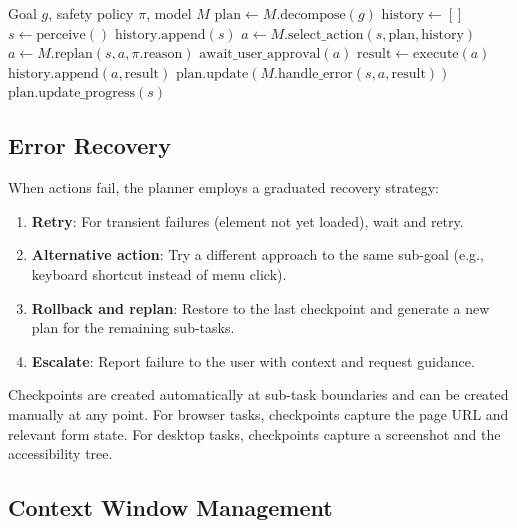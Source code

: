\begin{algorithm}[t]
\caption{Observation-Action Loop}
\label{alg:loop}
\begin{algorithmic}[1]
\REQUIRE Goal $g$, safety policy $\pi$, model $M$
\STATE $\text{plan} \gets M.\text{decompose}(g)$
\STATE $\text{history} \gets []$
    \STATE $s \gets \text{perceive}()$ 
    \STATE $\text{history.append}(s)$
    \STATE $a \gets M.\text{select\_action}(s, \text{plan}, \text{history})$
        \STATE $a \gets M.\text{replan}(s, a, \pi.\text{reason})$
    \ENDIF
        \STATE $\text{await\_user\_approval}(a)$
    \ENDIF
    \STATE $\text{result} \gets \text{execute}(a)$
    \STATE $\text{history.append}(a, \text{result})$
        \STATE $\text{plan.update}(M.\text{handle\_error}(s, a, \text{result}))$
    \ENDIF
    \STATE $\text{plan.update\_progress}(s)$
\ENDWHILE
\end{algorithmic}
\end{algorithm}

\subsection{Error Recovery}

When actions fail, the planner employs a graduated recovery strategy:

\begin{enumerate}[leftmargin=*]
    \item \textbf{Retry}: For transient failures (element not yet loaded), wait and retry.
    \item \textbf{Alternative action}: Try a different approach to the same sub-goal (e.g., keyboard shortcut instead of menu click).
    \item \textbf{Rollback and replan}: Restore to the last checkpoint and generate a new plan for the remaining sub-tasks.
    \item \textbf{Escalate}: Report failure to the user with context and request guidance.
\end{enumerate}

Checkpoints are created automatically at sub-task boundaries and can be created manually at any point. For browser tasks, checkpoints capture the page URL and relevant form state. For desktop tasks, checkpoints capture a screenshot and the accessibility tree.

\subsection{Context Window Management}

